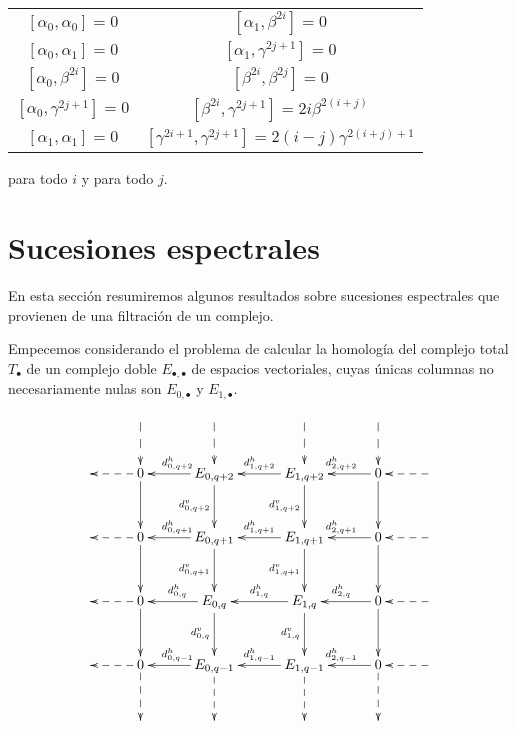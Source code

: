 \documentclass[a4paper,oneside,fleqn,11pt,../tesis.tex]{subfiles}
\begin{document}
\begin{example}
	\begin{center}
	\begin{tabular}{ c c }
 		$\left[\alpha_0, \alpha_0\right] = 0$ & $\left[\alpha_1, \beta^{2i}\right] = 0$ \\ 
 		$\left[\alpha_0, \alpha_1\right] = 0$ & $\left[\alpha_1, \gamma^{2j + 1}\right] = 0$\\  
 		$\left[\alpha_0, \beta^{2i}\right] = 0$ & $\left[\beta^{2i}, \beta^{2j}\right] = 0$ \\
 		$\left[\alpha_0, \gamma^{2j + 1}\right] = 0$ & $\left[\beta^{2i}, \gamma^{2j + 1}\right] = 2i\beta^{2(i + j)}$ \\
 		$\left[\alpha_1, \alpha_1\right] = 0$ & $\left[\gamma^{2i + 1}, \gamma^{2j + 1}\right] = 2(i - j)\gamma^{2(i + j) + 1}$ \\  
	\end{tabular}
	\end{center}
	para todo $i$ y para todo $j$.
\end{example}

\section{Sucesiones espectrales}\label{sucesiones_espectrales}

En esta sección resumiremos algunos resultados sobre sucesiones espectrales que provienen de una filtración de un complejo.

Empecemos considerando el problema de calcular la homología del complejo total $T_{\bullet}$ de un complejo doble
$E_{\bullet, \bullet}$ de espacios vectoriales, cuyas únicas columnas no necesariamente nulas son  $E_{0, \bullet}$ y $E_{1, \bullet}$.
\begin{align*}
    \xymatrix@=3em{
        &\ar@{-->}[d]& \ar@{-->}[d]& \ar@{-->}[d]& \ar@{-->}[d]& \\
        & 0 \ar@{-->}[l] \ar[d]& E_{0, q + 2} \ar[l]_{d^{h}_{0, q + 2}} \ar[d]_{d^{v}_{0, q + 2}}
            & E_{1,q + 2} \ar[l]_{d^{h}_{1, q + 2}} \ar[d]_{d^{v}_{1, q + 2}} & 0 \ar[l]_{d^{h}_{2, q + 2}} \ar[d] & \ar@{-->}[l]\\
        & 0 \ar@{-->}[l] \ar[d]& E_{0, q + 1} \ar[l]_{d^{h}_{0, q + 1}} \ar[d]_{d^{v}_{0, q + 1}}
            & E_{1,q + 1} \ar[l]_{d^{h}_{1, q + 1}} \ar[d]_{d^{v}_{1, q + 1}} & 0 \ar[l]_{d^{h}_{2, q + 1}} \ar[d]& \ar@{-->}[l]\\
        & 0 \ar@{-->}[l] \ar[d]& E_{0, q} \ar[l]_{d^{h}_{0, q}} \ar[d]_{d^{v}_{0, q}}
            & E_{1,q} \ar[l]_{d^{h}_{1, q}} \ar[d]_{d^{v}_{1, q}} & 0 \ar[l]_{d^{h}_{2, q}} \ar[d] &\ar@{-->}[l]\\
        & 0  \ar@{-->}[l] \ar@{-->}[d] & E_{0, q - 1} \ar[l]_{d^{h}_{0, q - 1}} \ar@{-->}[d]
            & E_{1, q- 1} \ar[l]_{d^{h}_{1 , q -1}} \ar@{-->}[d] & 0 \ar[l]_{d^{h}_{2, q - 1}} \ar@{-->}[d] &  \ar@{-->}[l]\\
        &&&&&
    }
\end{align*}
\end{document}
